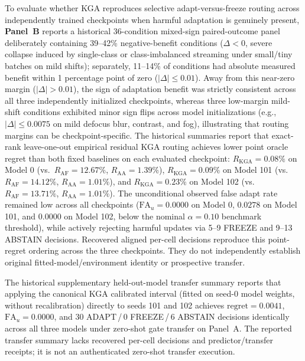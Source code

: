 To evaluate whether KGA reproduces selective adapt-versus-freeze routing across independently trained checkpoints when harmful adaptation is genuinely present, \textbf{Panel~B} reports a historical 36-condition mixed-sign paired-outcome panel deliberately containing 39--42\% negative-benefit conditions ($\Delta < 0$, severe collapse induced by single-class or class-imbalanced streaming under small/tiny batches on mild shifts); separately, 11--14\% of conditions had absolute measured benefit within 1 percentage point of zero ($|\Delta| \le 0.01$). Away from this near-zero margin ($|\Delta| > 0.01$), the sign of adaptation benefit was strictly consistent across all three independently initialized checkpoints, whereas three low-margin mild-shift conditions exhibited minor sign flips across model initializations (e.g., $|\Delta| \le 0.0075$ on mild defocus blur, contrast, and fog), illustrating that routing margins can be checkpoint-specific. The historical summaries report that exact-rank leave-one-out empirical residual KGA routing achieves lower point oracle regret than both fixed baselines on each evaluated checkpoint: $R_{\mathrm{KGA}} = 0.08\%$ on Model 0 (vs.\ $R_{\mathrm{AF}} = 12.67\%$, $R_{\mathrm{AA}} = 1.39\%$), $R_{\mathrm{KGA}} = 0.09\%$ on Model 101 (vs.\ $R_{\mathrm{AF}} = 14.12\%$, $R_{\mathrm{AA}} = 1.01\%$), and $R_{\mathrm{KGA}} = 0.23\%$ on Model 102 (vs.\ $R_{\mathrm{AF}} = 13.71\%$, $R_{\mathrm{AA}} = 1.01\%$). The unconditional observed false adapt rate remained low across all checkpoints ($\mathrm{FA}_u = 0.0000$ on Model 0, $0.0278$ on Model 101, and $0.0000$ on Model 102, below the nominal $\alpha = 0.10$ benchmark threshold), while actively rejecting harmful updates via 5--9 FREEZE and 9--13 ABSTAIN decisions. Recovered aligned per-cell decisions reproduce this point-regret ordering across the three checkpoints. They do not independently establish original fitted-model/environment identity or prospective transfer.

 The historical supplementary held-out-model transfer summary reports that applying the canonical KGA calibrated interval (fitted on seed-0 model weights, without recalibration) directly to seeds 101 and 102 achieves $\mathrm{regret} = 0.0041$, $\mathrm{FA}_u = 0.0000$, and $30$ ADAPT\,/\,$0$ FREEZE\,/\,$6$ ABSTAIN decisions identically across all three models under zero-shot gate transfer on Panel~A. The reported transfer summary lacks recovered per-cell decisions and predictor/transfer receipts; it is not an authenticated zero-shot transfer execution.


